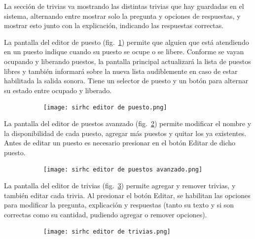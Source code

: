 \documentclass{article}
\begin{document}
La sección de trivias va mostrando las distintas trivias que hay guardadas en el sistema, alternando entre mostrar solo la pregunta y opciones de respuestas, y mostrar esto junto con la explicación, indicando las respuestas correctas.

La pantalla del editor de puesto (fig.~\ref{fig:editorPuestoManual}) permite que alguien que está atendiendo en un puesto indique cuando su puesto se ocupe o se libere. Conforme se vayan ocupando y liberando puestos, la pantalla principal actualizará la lista de puestos libres y también informará sobre la nueva lista audiblemente en caso de estar habilitada la salida sonora. Tiene un selector de puesto y un botón para alternar su estado entre ocupado y liberado.
\begin{figure}[H]
	\caption{Interfaz del editor de puesto}
    \begin{subfigure}{1\textwidth}
	\texttt{[image: sirhc editor de puesto.png]}
    \end{subfigure}
	\label{fig:editorPuestoManual}
\end{figure}
\vspace{-1.0\baselineskip}

La pantalla del editor de puestos avanzado (fig.~\ref{fig:editorPuestosAvanzadoManual}) permite modificar el nombre y la disponibilidad de cada puesto, agregar más puestos y quitar los ya existentes. Antes de editar un puesto es necesario presionar en el botón Editar de dicho puesto.
\begin{figure}[H]
	\caption{Interfaz del editor de puestos avanzado}
    \begin{subfigure}{1\textwidth}
	\texttt{[image: sirhc editor de puestos avanzado.png]}
    \end{subfigure}
    \label{fig:editorPuestosAvanzadoManual}
\end{figure}
\vspace{-1.0\baselineskip}

La pantalla del editor de trivias (fig.~\ref{fig:editorTriviasManual}) permite agregar y remover trivias, y también editar cada trivia. Al presionar el botón Editar, se habilitan las opciones para modificar la pregunta, explicación y respuestas (tanto su texto y si son correctas como su cantidad, pudiendo agregar o remover opciones).
\begin{figure}[H]
	\caption{Interfaz del editor de trivias}
    \begin{subfigure}{1\textwidth}
	\texttt{[image: sirhc editor de trivias.png]}
    \end{subfigure}
	\label{fig:editorTriviasManual}
\end{figure}
\vspace{-1.0\baselineskip}
\end{document}
